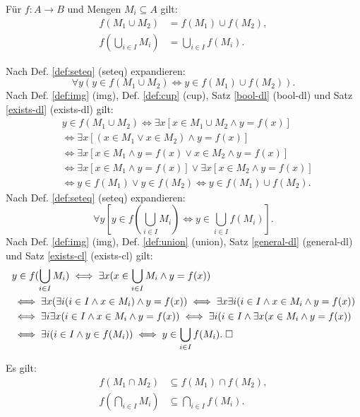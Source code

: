 \begin{Satz}
Für $f\colon A\to B$ und Mengen $M_i\subseteq A$ gilt:
\begin{align}
f(M_1\cup M_2) &= f(M_1)\cup f(M_2),\\
f(\bigcup_{i\in I} M_i) &= \bigcup_{i\in I} f(M_i).
\end{align}
\end{Satz}
\begin{Beweis}
Nach Def. \ref{def:seteq} (seteq) expandieren:
\[\forall y(y\in f(M_1\cup M_2)\iff y\in f(M_1)\cup f(M_2)).\]
Nach Def. \ref{def:img} (img), Def. \ref{def:cup} (cup),
Satz \ref{bool-dl} (bool-dl) und Satz \ref{exists-dl} (exists-dl) gilt:
\begin{align*}
&y\in f(M_1\cup M_2) \iff \exists x[x\in M_1\cup M_2\land y=f(x)]\\
&\iff \exists x[(x\in M_1\lor x\in M_2)\land y=f(x)]\\
&\iff \exists x[x\in M_1\land y=f(x)\lor x\in M_2\land y=f(x)]\\
&\iff \exists x[x\in M_1\land y=f(x)]\lor\exists x[x\in M_2\land y=f(x)]\\
&\iff y\in f(M_1)\lor y\in f(M_2) \iff y\in f(M_1)\cup f(M_2).
\end{align*}
Nach Def. \ref{def:seteq} (seteq) expandieren:
\[\forall y[y\in f(\bigcup_{i\in I} M_i)\iff y\in \bigcup_{i\in I} f(M_i)].\]
Nach Def. \ref{def:img} (img), Def. \ref{def:union} (union),
Satz \ref{general-dl} (general-dl)\\
und Satz \ref{exists-cl} (exists-cl) gilt:
\begin{align*}
& y\in f(\bigcup_{i\in I} M_i)
\iff \exists x(x\in\bigcup_{i\in I} M_i\land y=f(x))\\
&\iff \exists x(\exists i(i\in I\land x\in M_i)\land y=f(x))
\iff \exists x\exists i(i\in I\land x\in M_i\land y=f(x))\\
&\iff \exists i\exists x(i\in I\land x\in M_i\land y=f(x))
\iff \exists i(i\in I\land\exists x(x\in M_i\land y=f(x))\\
&\iff \exists i(i\in I\land y\in f(M_i))
\iff y\in\bigcup_{i\in I} f(M_i).\;\square
\end{align*}
\end{Beweis}

\begin{Satz}
Es gilt:
\begin{align}
f(M_1\cap M_2) &\subseteq f(M_1)\cap f(M_2),\\
f(\bigcap_{i\in I} M_i) &\subseteq \bigcap_{i\in I} f(M_i).
\end{align}
\end{Satz}

